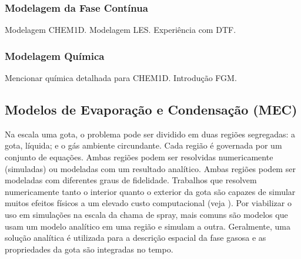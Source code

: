 



\subsubsection{Modelagem da Fase Contínua} \label{sec:gas}

Modelagem CHEM1D. 
Modelagem LES.
Experiência com DTF.

\subsubsection{Modelagem Química} \label{sec:chem}

Mencionar química detalhada para CHEM1D.
Introdução FGM.


\subsection{Modelos de Evaporação e Condensação (MEC)} \label{sec:MEC}


Na escala uma gota, o problema pode ser dividido em duas regiões segregadas: a gota, líquida; e o gás ambiente circundante. 
Cada região é governada por um conjunto de equações.
Ambas regiões podem ser resolvidas numericamente (simuladas) ou modeladas com um resultado analítico.
Ambas regiões podem ser modeladas com diferentes graus de fidelidade.
Trabalhos que resolvem numericamente tanto o interior quanto o exterior da gota são capazes de simular muitos efeitos físicos a um elevado custo computacional (veja ).
Por viabilizar o uso em simulações na escala da chama de spray, mais comuns são modelos que usam um modelo analítico em uma região e simulam a outra.
Geralmente, uma solução analítica é utilizada para a descrição espacial da fase gasosa e as propriedades da gota são integradas no tempo. 

